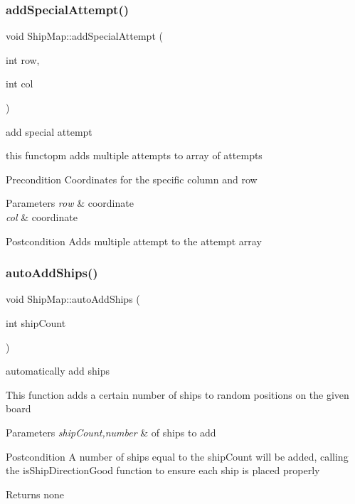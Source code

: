 \subsubsection{\texorpdfstring{add\+Special\+Attempt()}{addSpecialAttempt()}}
{\footnotesize\ttfamily void Ship\+Map\+::add\+Special\+Attempt (\begin{DoxyParamCaption}\item[{int}]{row,  }\item[{int}]{col }\end{DoxyParamCaption})}

add special attempt

this functopm adds multiple attempts to array of attempts \begin{DoxyPrecond}{Precondition}
Coordinates for the specific column and row 
\end{DoxyPrecond}

\begin{DoxyParams}{Parameters}
{\em row} & coordinate \\
\hline
{\em col} & coordinate \\
\hline
\end{DoxyParams}
\begin{DoxyPostcond}{Postcondition}
Adds multiple attempt to the attempt array 
\end{DoxyPostcond}
\mbox{\label{classShipMap_ad8b0821085e4fe522658c529f72ce477}} 
\subsubsection{\texorpdfstring{auto\+Add\+Ships()}{autoAddShips()}}
{\footnotesize\ttfamily void Ship\+Map\+::auto\+Add\+Ships (\begin{DoxyParamCaption}\item[{int}]{ship\+Count }\end{DoxyParamCaption})}

automatically add ships

This function adds a certain number of ships to random positions on the given board 
\begin{DoxyParams}{Parameters}
{\em ship\+Count,number} & of ships to add \\
\hline
\end{DoxyParams}
\begin{DoxyPostcond}{Postcondition}
A number of ships equal to the ship\+Count will be added, calling the is\+Ship\+Direction\+Good function to ensure each ship is placed properly 
\end{DoxyPostcond}
\begin{DoxyReturn}{Returns}
none 
\end{DoxyReturn}
\mbox{\label{classShipMap_aad5f7baf4e69a8bee04b3d132c52ead1}} 
